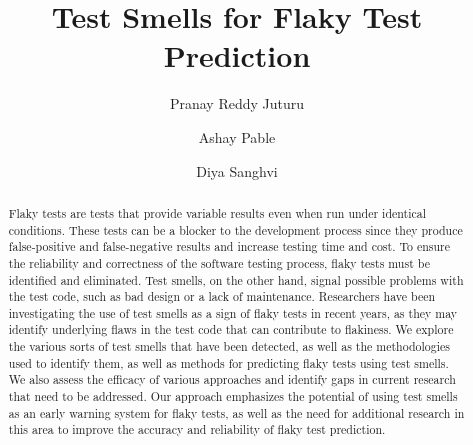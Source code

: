 \documentclass[sigconf,review]{acmart}
\begin{document}
\title{Test Smells for Flaky Test Prediction}


\author{Pranay Reddy Juturu}

\author{Ashay Pable}
  
\author{Diya Sanghvi}
  




\begin{abstract}
Flaky tests are tests that provide variable results even when run under identical conditions. These tests can be a blocker to the development process since they produce false-positive and false-negative results and increase testing time and cost. To ensure the reliability and correctness of the software testing process, flaky tests must be identified and eliminated. Test smells, on the other hand, signal possible problems with the test code, such as bad design or a lack of maintenance. Researchers have been investigating the use of test smells as a sign of flaky tests in recent years, as they may identify underlying flaws in the test code that can contribute to flakiness. We explore the various sorts of test smells that have been detected, as well as the methodologies used to identify them, as well as methods for predicting flaky tests using test smells. We also assess the efficacy of various approaches and identify gaps in current research that need to be addressed. Our approach emphasizes the potential of using test smells as an early warning system for flaky tests, as well as the need for additional research in this area to improve the accuracy and reliability of flaky test prediction.
\end{abstract}
\end{document}
